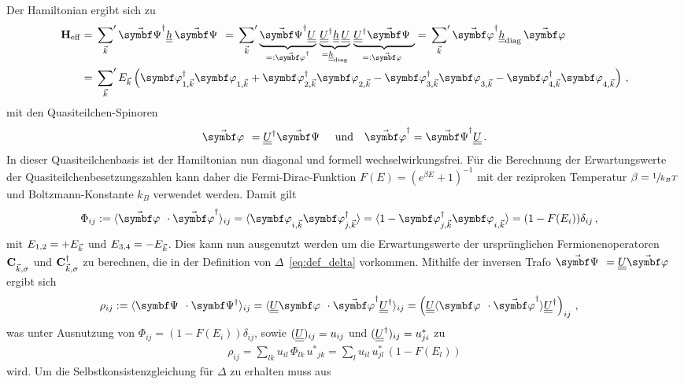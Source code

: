 Der Hamiltonian ergibt sich zu
\begin{align}
    \oHeff &= \sump{\vk} \vopsid \dul{h} \, \vopsi = \sump{\vk} \underbrace{\vopsid \dul{U}}_{=: \vophid} \, \underbrace{\dul{U}^\dagg \dul {h} \, \dul{U}}_{= \dul{h}_\text{diag}} \, \underbrace{\dul{U}^\dagg \vopsi}_{=: \vophi} = \sump{\vk} \vophid \dul{h}_\text{diag} \, \vophi \\
    &= \sump{\vk} E_\vk \left(\ophioned \ophione + \ophitwod \ophitwo - \ophithreed \ophithree - \ophifourd \ophifour \right) \, ,
\end{align}
mit den Quasiteilchen-Spinoren 
\begin{align}
    \vophi = \dul{U}^\dagger \vopsi & & \text{und} & & \vophid = \vopsid \dul{U} \, .
\end{align}
In dieser Quasiteilchenbasis ist der Hamiltonian nun diagonal und formell wechselwirkungsfrei.
Für die Berechnung der Erwartungswerte der Quasiteilchenbesetzungszahlen kann daher die Fermi-Dirac-Funktion $F(E) = (e^{\beta E} + 1)^{-1}$ mit der reziproken Temperatur $\beta = \sfrac{1}{k_B T}$ und Boltzmann-Konstante $k_B$ verwendet werden.
Damit gilt
\begin{align}
    \Phi_{ij} := \expval{\vophi \cdot \vophid}_{ij} = \expval{\ophi_{i, \vk} \ophid_{j, \vk}} &= \expval{1 -\ophid_{j, \vk}  \ophi_{i, \vk}} = (1 - F(E_i))\delta_{ij} \, ,
\end{align}
mit $E_{1,2} = + E_{\vec{k}} $ und $E_{3,4} = - E_{\vec{k}}$.
Dies kann nun ausgenutzt werden um die Erwartungswerte der ursprünglichen Fermionenoperatoren $\oc{\vk, \sigma}$ und $\mathbf{C}^{\dagger}_{{\vec{k}}, \sigma}$ zu berechnen, die in der Definition von $\Delta$~\eqref{eq:def_delta} vorkommen.
Mithilfe der inversen Trafo $\vopsi = \dul{U} \vophi$ ergibt sich
\begin{align}
    \rho_{ij} &:= \expval{\opsi \cdot \opsid}_{ij} = \expval{\dul{U} \ophi \cdot \vophid \dul{U}^\dagger}_{ij} = \left(\dul{U} \expval{\ophi \cdot \vophid} \dul{U}^\dagg\right)_{ij} \, ,
\end{align}
was unter Ausnutzung von $\Phi_{ij} = (1 - F(E_i))\delta_{ij}$, sowie $(\underline{\underline{U}})_{ij} = u_{ij}$ und $(\underline{\underline{U}}^\dagger)_{ij} = u_{ji}^*$ zu  
\begin{align}
    \rho_{ij} = \sum_{lk} u_{il} \, \Phi_{lk} \,  {u^*}_{jk} = \sum_{l} u_{il} \, u_{jl}^* \, (1 - F(E_l))
\end{align}
wird.
Um die Selbstkonsistenzgleichung für $\Delta$ zu erhalten muss aus 
